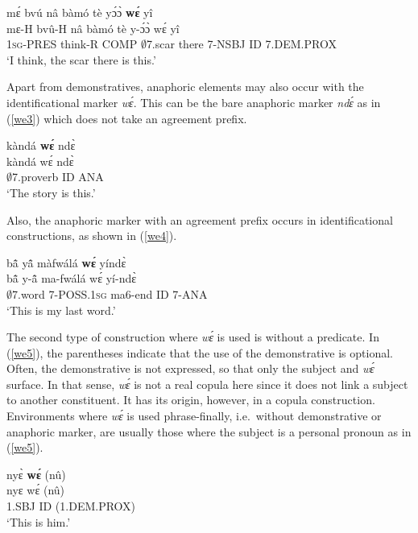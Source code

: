 \begin{exe} 
\ex\label{we2}
  \glll     mɛ́ bvú nâ bàmó tè yɔ́ɔ̀ {\bfseries wɛ́} yî \\
          mɛ-H bvû-H nâ bàmó tè y-ɔ́ɔ̀ wɛ́ yî \\
              1\textsc{sg}-PRES think-R COMP $\emptyset$7.scar there 7-NSBJ ID 7.DEM.PROX \\
    \trans `I think, the scar there is this.'
\end{exe}

Apart from demonstratives, anaphoric elements may also occur with the identificational marker {\itshape wɛ́}. This can be the bare anaphoric marker {\itshape ndɛ́} as in (\ref{we3}) which does not take an agreement prefix. 

\begin{exe} 
\ex\label{we3}
  \glll kàndá {\bfseries wɛ́} ndɛ̀ \\
        kàndá wɛ́ ndɛ̀ \\
        $\emptyset$7.proverb ID ANA  \\
    \trans `The story is this.'
\end{exe}

\noindent Also, the anaphoric marker with an agreement prefix occurs in identificational constructions, as shown in (\ref{we4}).

\begin{exe} 
\ex\label{we4}
  \glll bã̂ yã̂ màfwálá {\bfseries wɛ́} yíndɛ̀ \\
        bã̂ y-ã̂ ma-fwálá wɛ́ yí-ndɛ̀ \\
         $\emptyset$7.word 7-POSS.1\textsc{sg} ma6-end ID 7-ANA \\
    \trans `This is my last word.'
\end{exe}


The second type of construction where {\itshape wɛ́} is used is without a predicate. In (\ref{we5}), the parentheses indicate that the use of the demonstrative is optional. Often, the demonstrative is not expressed, so that only the subject and {\itshape wɛ́} surface. In that sense, {\itshape wɛ́} is not a real copula here since it does not link a subject to another constituent. It has its origin, however, in a copula construction. Environments where {\itshape wɛ́} is used phrase-finally, i.e.\ without demonstrative or anaphoric marker, are usually those where the subject is a personal pronoun as in (\ref{we5}).


\begin{exe} 
\ex\label{we5} 
  \glll  nyɛ̀ {\bfseries wɛ́} (nû) \\
         nyɛ wɛ́ (nû)\\
       1.SBJ ID  (1.DEM.PROX)\\
    \trans `This is him.'
\end{exe}

